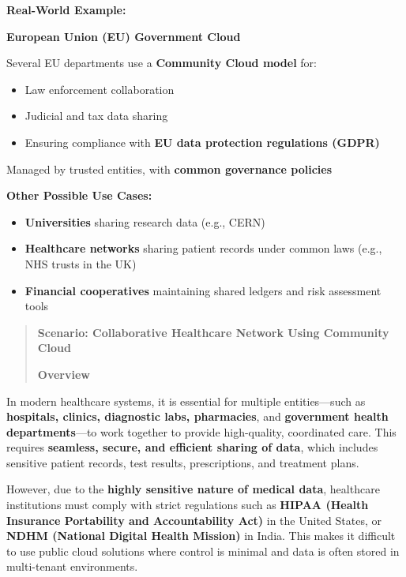 \documentclass[12pt]{article}
\begin{document}
\textbf{Real-World Example:}

\textbf{European Union (EU) Government Cloud}

Several EU departments use a \textbf{Community Cloud model} for:

\begin{itemize}
\item
  Law enforcement collaboration
\item
  Judicial and tax data sharing
\item
  Ensuring compliance with \textbf{EU data protection regulations
  (GDPR)}
\end{itemize}

Managed by trusted entities, with \textbf{common governance policies}

\textbf{Other Possible Use Cases:}

\begin{itemize}
\item
  \textbf{Universities} sharing research data (e.g., CERN)
\item
  \textbf{Healthcare networks} sharing patient records under common laws
  (e.g., NHS trusts in the UK)
\item
  \textbf{Financial cooperatives} maintaining shared ledgers and risk
  assessment tools
\end{itemize}

\begin{quote}
\textbf{Scenario: Collaborative Healthcare Network Using Community
Cloud}

\textbf{Overview}
\end{quote}

In modern healthcare systems, it is essential for multiple
entities---such as \textbf{hospitals, clinics, diagnostic labs,
pharmacies}, and \textbf{government health departments}---to work
together to provide high-quality, coordinated care. This requires
\textbf{seamless, secure, and efficient sharing of data}, which includes
sensitive patient records, test results, prescriptions, and treatment
plans.

However, due to the \textbf{highly sensitive nature of medical data},
healthcare institutions must comply with strict regulations such as
\textbf{HIPAA (Health Insurance Portability and Accountability Act)} in
the United States, or \textbf{NDHM (National Digital Health Mission)} in
India. This makes it difficult to use public cloud solutions where
control is minimal and data is often stored in multi-tenant
environments.
\end{document}
